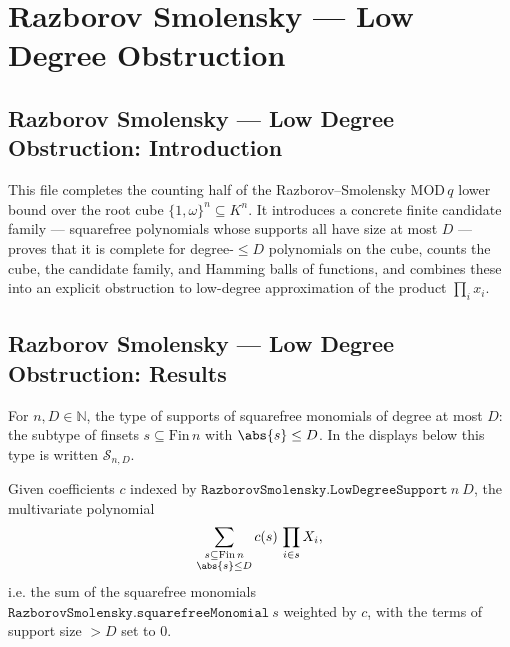 \section{Razborov Smolensky --- Low Degree Obstruction}
\subsection*{Razborov Smolensky --- Low Degree Obstruction: Introduction}

This file completes the counting half of the Razborov--Smolensky $\mathrm{MOD}\,q$ lower
bound over the root cube $\{1,\omega\}^n \subseteq K^n$.  It introduces a concrete finite
candidate family --- squarefree polynomials whose supports all have size at most $D$ ---
proves that it is complete for degree-$\le D$ polynomials on the cube, counts the cube,
the candidate family, and Hamming balls of functions, and combines these into an explicit
obstruction to low-degree approximation of the product $\prod_i x_i$.

\subsection*{Razborov Smolensky --- Low Degree Obstruction: Results}

\begin{definition}
\label{RazborovSmolensky.LowDegreeSupport}
\leanok
For $n, D \in \mathbb{N}$, the type of supports of squarefree monomials of degree at most
$D$: the subtype of finsets $s \subseteq \mathrm{Fin}\,n$ with $\abs{s} \le D$.  In the
displays below this type is written $\mathcal{S}_{n,D}$.
\end{definition}

\begin{definition}
\label{RazborovSmolensky.lowDegreeSquarefreePolynomial}
\leanok
{}
Given coefficients $c$ indexed by $\texttt{RazborovSmolensky.LowDegreeSupport}\ n\ D$, the multivariate
polynomial
\[
\sum_{\substack{s \subseteq \mathrm{Fin}\,n \\ \abs{s} \le D}} c(s)\, \prod_{i \in s} X_i ,
\]
i.e. the sum of the squarefree monomials $\texttt{RazborovSmolensky.squarefreeMonomial}\ s$ weighted by
$c$, with the terms of support size $> D$ set to $0$.
\end{definition}


